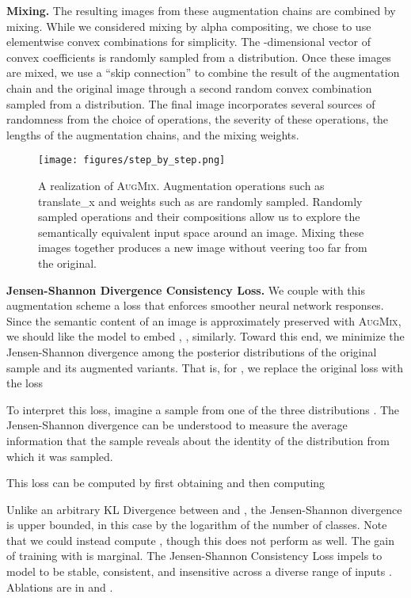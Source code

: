 \documentclass{article} \usepackage{iclr2020_conference,times}
\begin{document}
\noindent\textbf{Mixing.} The resulting images from these augmentation chains are combined by mixing. While we considered mixing by alpha compositing, we chose to use elementwise convex combinations for simplicity. The -dimensional vector of convex coefficients is randomly sampled from a  distribution. Once these images are mixed, we use a ``skip connection'' to combine the result of the augmentation chain and the original image through a second random convex combination sampled from a  distribution. The final image incorporates several sources of randomness from the choice of operations, the severity of these operations, the lengths of the augmentation chains, and the mixing weights.





\begin{figure}[t]
\vspace{-10pt}
\centering
\texttt{[image: figures/step\_by\_step.png]}
\caption{A realization of \textsc{AugMix}. Augmentation operations such as translate\_x and weights such as  are randomly sampled. Randomly sampled operations and their compositions allow us to explore the semantically equivalent input space around an image. Mixing these images together produces a new image without veering too far from the original.}
\label{fig:augmix:illustration}
\vspace{-15pt}
\end{figure}

\noindent\textbf{Jensen-Shannon Divergence Consistency Loss.} We couple with this augmentation scheme a loss that enforces smoother neural network responses.
Since the semantic content of an image is approximately preserved with \textsc{AugMix}, we should like the model to embed , ,  similarly. Toward this end, we minimize the Jensen-Shannon divergence among the posterior distributions of the original sample  and its augmented variants. That is, for , we replace the original loss  with the loss


To interpret this loss, imagine a sample from one of the three distributions .
The Jensen-Shannon divergence can be understood to measure the average information that the sample reveals about the identity of the distribution from which it was sampled.

This loss can be computed by first obtaining  
and then computing
 
Unlike an arbitrary KL Divergence between  and , the Jensen-Shannon divergence is upper bounded, in this case by the logarithm of the number of classes. Note that we could instead compute , though this does not perform as well. The gain of training with  is marginal.
The Jensen-Shannon Consistency Loss impels to model to be stable, consistent, and insensitive across a diverse range of inputs \citep{Bachman,Zheng_2016,alp}.
Ablations are in  and . 
\end{document}
